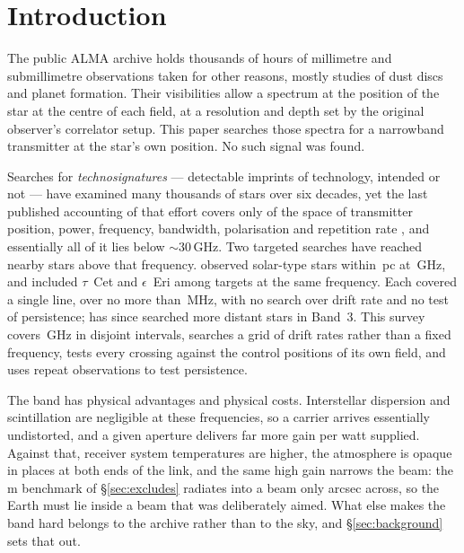\section{Introduction}
\label{sec:intro}

The public ALMA archive holds thousands of hours of millimetre and
submillimetre observations taken for other reasons, mostly studies of dust
discs and planet formation. Their visibilities allow a spectrum at the
position of the star at the centre of each field, at a resolution and depth
set by the original observer's correlator setup. This paper searches those
spectra for a narrowband transmitter at the star's own position. No such
signal was found.

Searches for \emph{technosignatures} --- detectable imprints of technology,
intended or not
\citep{Sheikh2020,SETIreview2025} --- have examined many thousands of stars
over six decades, yet the last published accounting of that effort covers
only \HaystackFrac{} of the space of transmitter position, power, frequency,
bandwidth, polarisation and repetition rate
\citep{Wright2018}, and essentially all of it lies below
${\sim}30$\,GHz. Two targeted searches have reached nearby stars above that frequency.
\citet{Steffes1994} observed \SbPriorNStarA{} solar-type stars within
\SbPriorDistA\,pc at \SbPriorFreqGHz\,GHz, and \citet{Mauersberger1996}
included $\tau$~Cet and $\epsilon$~Eri among \SbPriorNStarB{} targets at the
same frequency. Each covered a single line, over no more than
\SbPriorBandMHz\,MHz, with no search over drift rate and no test of
persistence; \citet{Mason2025} has since searched more distant stars in
Band~3. This survey covers
\DnuA\,GHz in \CovNIslands{} disjoint intervals, searches a grid of drift rates rather
than a fixed frequency, tests every crossing against the \BdNCtrl{} control positions of
its own field, and uses repeat observations to test persistence.

The band has physical advantages and physical costs. Interstellar dispersion
and scintillation are negligible at these frequencies, so a carrier arrives
essentially undistorted, and a given aperture delivers far more gain per watt
supplied. Against that, receiver system temperatures are higher, the
atmosphere is opaque in places at both ends of the link, and the same high
gain narrows the beam: the \BenchDiam\,m benchmark of
\S\ref{sec:excludes} radiates into a beam only \BmArcsec{} arcsec across, so
the Earth must lie inside a beam that was deliberately aimed. What else makes
the band hard belongs to the archive rather than to the sky, and
\S\ref{sec:background} sets that out.

